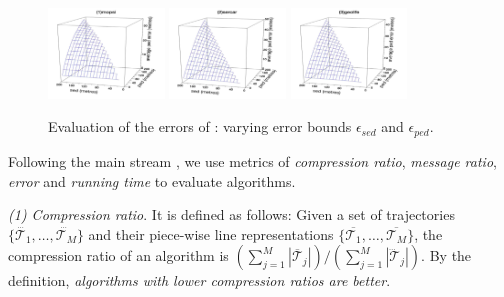 {\begin{figure}[tb!]
	\centering
	\includegraphics[width= 0.275\textwidth]{figures/Fig-BITT-mopsi-ped-error.png}\hspace{6ex}
	\includegraphics[width= 0.275\textwidth]{figures/Fig-BITT-sercar-ped-error.png}\hspace{6ex}
	\includegraphics[width= 0.275\textwidth]{figures/Fig-BITT-geolife-ped-error.png}\hspace{0ex}
	\vspace{-2ex}
	\caption{\small Evaluation of the \ped errors of \bitt: varying error bounds $\epsilon_{sed}$ and $\epsilon_{ped}$.}
	\label{fig:bitt-ped-error}
	\vspace{-1ex}
\end{figure}

	
Following the main stream \cite{Trajcevski:LDRH, Lange:GRTS, Lange:Tracking, Lin:Cised, Zhang:Evaluation}, we use metrics of \emph{compression ratio}, \emph{message ratio}, \emph{error} and \emph{running time} to evaluate algorithms.

 \ni \emph{(1) Compression ratio}. {It is defined as follows: Given a set of trajectories $\{\dddot{\mathcal{T}_1}, \ldots, \dddot{\mathcal{T}_M}\}$ and their piece-wise line representations $\{\overline{\mathcal{T}_1}, \ldots, \overline{\mathcal{T}_M}\}$, the compression ratio of an algorithm is $(\sum_{j=1}^{M} |\overline{\mathcal{T}}_j |)/(\sum_{j=1}^{M} |\dddot{\mathcal{T}}_j |)$.
	By the definition, \emph{algorithms with lower compression ratios are better}.}

}
